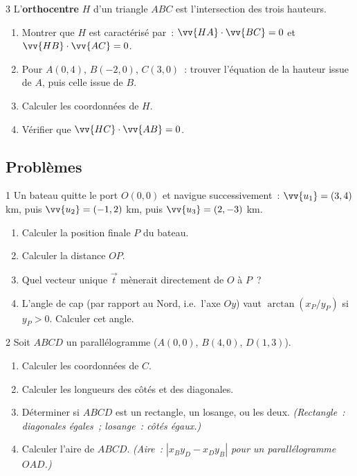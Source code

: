 \begin{exo}{3}
L'\textbf{orthocentre} $H$ d'un triangle $ABC$ est l'intersection
des trois hauteurs.
\begin{enumerate}
  \item Montrer que $H$ est caract\'eris\'e par~:
        $\vv{HA}\cdot\vv{BC}=0$ et $\vv{HB}\cdot\vv{AC}=0$.
  \item Pour $A(0,4)$, $B(-2,0)$, $C(3,0)$~:
        trouver l'\'equation de la hauteur issue de $A$,
        puis celle issue de $B$.
  \item Calculer les coordonn\'ees de $H$.
  \item V\'erifier que $\vv{HC}\cdot\vv{AB}=0$.
\end{enumerate}
\end{exo}

\subsection*{Probl\`emes}

\begin{probleme}{1}
Un bateau quitte le port $O(0,0)$ et navigue successivement~:
$\vv{u_1}=(3,4)$ km, puis $\vv{u_2}=(-1,2)$ km, puis $\vv{u_3}=(2,-3)$ km.
\begin{enumerate}
  \item Calculer la position finale $P$ du bateau.
  \item Calculer la distance $OP$.
  \item Quel vecteur unique $\vec{t}$ m\`enerait directement de $O$ \`a $P$~?
  \item L'angle de cap (par rapport au Nord, i.e.\ l'axe $Oy$) vaut
        $\arctan(x_P/y_P)$ si $y_P>0$. Calculer cet angle.
\end{enumerate}
\end{probleme}

\begin{probleme}{2}
Soit $ABCD$ un parall\'elogramme ($A(0,0)$, $B(4,0)$, $D(1,3)$).
\begin{enumerate}
  \item Calculer les coordonn\'ees de $C$.
  \item Calculer les longueurs des c\^ot\'es et des diagonales.
  \item D\'eterminer si $ABCD$ est un rectangle, un losange, ou les deux.
        \emph{(Rectangle~: diagonales \'egales~; losange~: c\^ot\'es \'egaux.)}
  \item Calculer l'aire de $ABCD$.
        \emph{(Aire~: $|x_B y_D - x_D y_B|$ pour un parall\'elogramme $OAD$.)}
\end{enumerate}
\end{probleme}


